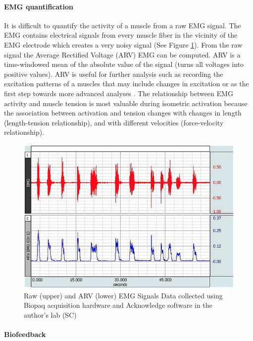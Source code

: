 \paragraph{EMG quantification} It is difficult to quantify the activity of a muscle from a raw EMG signal. The EMG contains electrical signals from every muscle fiber in the vicinity of the EMG electrode which creates a very noisy signal (See Figure \ref{fig:EMG_ARV}). From the raw signal the Average Rectified Voltage (ARV) EMG can be computed. ARV is a time-windowed mean of the absolute value of the signal (turns all voltages into positive values). ARV is useful for further analysis such as recording the excitation patterns of a muscles that may include changes in excitation or as the first step towards more advanced analyses \cite{merletti_surface_2016}. The relationship between EMG activity and muscle tension is most valuable during isometric activation because the association between activation and tension changes with changes in length (length-tension relationship), and with different velocities (force-velocity relationship).

\begin{figure}[!ht]
    \centering
    \includegraphics[width=1\linewidth]{./figure/EMG_ARV.png}
    \caption{Raw (upper) and ARV (lower) EMG Signals \footnotesize{Data collected using Biopaq acquisition hardware and Acknowledge software in the author's lab (SC)}}
    \label{fig:EMG_ARV}
\end{figure}

\paragraph{Biofeedback}


